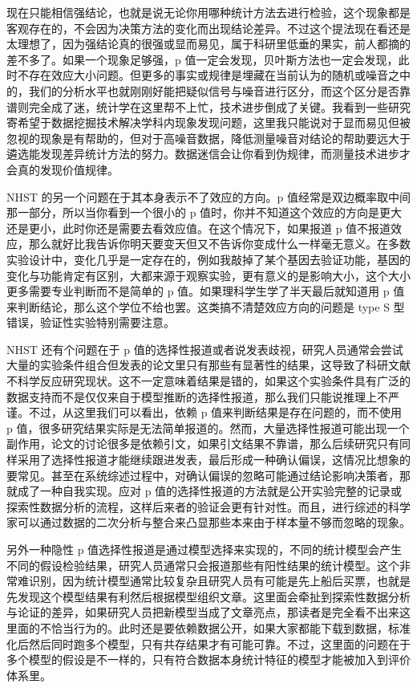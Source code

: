 \documentclass[]{tufte-book}
\begin{document}
现在只能相信强结论，也就是说无论你用哪种统计方法去进行检验，这个现象都是客观存在的，不会因为决策方法的变化而出现结论差异。不过这个提法现在看还是太理想了，因为强结论真的很强或显而易见，属于科研里低垂的果实，前人都摘的差不多了。如果一个现象足够强，p 值一定会发现，贝叶斯方法也一定会发现，此时不存在效应大小问题。但更多的事实或规律是埋藏在当前认为的随机或噪音之中的，我们的分析水平也就刚刚好能把疑似信号与噪音进行区分，而这个区分是否靠谱则完全成了迷，统计学在这里帮不上忙，技术进步倒成了关键。我看到一些研究寄希望于数据挖掘技术解决学科内现象发现问题，这里我只能说对于显而易见但被忽视的现象是有帮助的，但对于高噪音数据，降低测量噪音对结论的帮助要远大于遴选能发现差异统计方法的努力。数据迷信会让你看到伪规律，而测量技术进步才会真的发现价值规律。

NHST 的另一个问题在于其本身表示不了效应的方向。p 值经常是双边概率取中间那一部分，所以当你看到一个很小的 p 值时，你并不知道这个效应的方向是更大还是更小，此时你还是需要去看效应值。在这个情况下，如果报道 p 值不报道效应，那么就好比我告诉你明天要变天但又不告诉你变成什么一样毫无意义。在多数实验设计中，变化几乎是一定存在的，例如我敲掉了某个基因去验证功能，基因的变化与功能肯定有区别，大都来源于观察实验，更有意义的是影响大小，这个大小更多需要专业判断而不是简单的 p 值。如果理科学生学了半天最后就知道用 p 值来判断结论，那么这个学位不给也罢。这类搞不清楚效应方向的问题是 type S 型错误，验证性实验特别需要注意。

NHST 还有个问题在于 p 值的选择性报道或者说发表歧视，研究人员通常会尝试大量的实验条件组合但发表的论文里只有那些有显著性的结果，这导致了科研文献不科学反应研究现状。这不一定意味着结果是错的，如果这个实验条件具有广泛的数据支持而不是仅仅来自于模型推断的选择性报道，那么我们只能说推理上不严谨。不过，从这里我们可以看出，依赖 p 值来判断结果是存在问题的，而不使用 p 值，很多研究结果实际是无法简单报道的。然而，大量选择性报道可能出现一个副作用，论文的讨论很多是依赖引文，如果引文结果不靠谱，那么后续研究只有同样采用了选择性报道才能继续跟进发表，最后形成一种确认偏误，这情况比想象的要常见。甚至在系统综述过程中，对确认偏误的忽略可能通过结论影响决策者，那就成了一种自我实现。应对 p 值的选择性报道的方法就是公开实验完整的记录或探索性数据分析的流程，这样后来者的验证会更有针对性。而且，进行综述的科学家可以通过数据的二次分析与整合来凸显那些本来由于样本量不够而忽略的现象。

另外一种隐性 p 值选择性报道是通过模型选择来实现的，不同的统计模型会产生不同的假设检验结果，研究人员通常只会报道那些有阳性结果的统计模型。这个非常难识别，因为统计模型通常比较复杂且研究人员有可能是先上船后买票，也就是先发现这个模型结果有利然后根据模型组织文章。这里面会牵扯到探索性数据分析与论证的差异，如果研究人员把新模型当成了文章亮点，那读者是完全看不出来这里面的不恰当行为的。此时还是要依赖数据公开，如果大家都能下载到数据，标准化后然后同时跑多个模型，只有共存结果才有可能可靠。不过，这里面的问题在于多个模型的假设是不一样的，只有符合数据本身统计特征的模型才能被加入到评价体系里。
\end{document}
